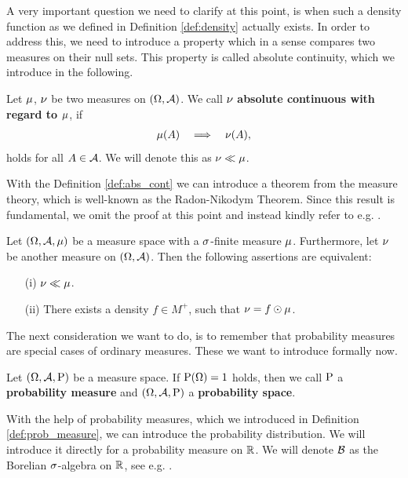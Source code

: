 A very important question we need to clarify at this point, is when such a density function as we defined in Definition \ref{def:density} actually exists. In order to address this, we need to introduce a property which in a sense compares two measures on their null sets. This property is called absolute continuity, which we introduce in the following.

\begin{definition}\label{def:abs_cont}
Let $\operatorname{\mu}$, $\operatorname{\nu}$ be two measures on $(\Omega, \operatorname{\mathcal{A}})$. We call $\operatorname{\nu}$ \textbf{absolute continuous with regard to $\operatorname{\mu}$}, if
\begin{align*}
\operatorname{\mu}(A) \quad \Longrightarrow \quad \operatorname{\nu}(A),
\end{align*}
holds for all $A\in\operatorname{\mathcal{A}}$. We will denote this as $\operatorname{\nu} \ll \operatorname{\mu}$.
\end{definition}

With the Definition \ref{def:abs_cont} we can introduce a theorem from the measure theory, which is well-known as the Radon-Nikodym Theorem. Since this result is fundamental, we omit the proof at this point and instead kindly refer to e.g. \cite[Theorem~2.38]{meintrup2006stochastik}.

\begin{theorem}\label{theoreom:radon-nikodym}
Let $(\Omega, \operatorname{\mathcal{A}}, \operatorname{\mu})$ be a measure space with a $\operatorname{\sigma}$-finite measure $\operatorname{\mu}$. Furthermore, let $\operatorname{\nu}$ be another measure on $(\Omega, \operatorname{\mathcal{A}})$. Then the following assertions are equivalent:
\begin{enumerate}
\item[(i)] $\operatorname{\nu} \ll \operatorname{\mu}$.
\item[(ii)] There exists a density $f\in M^{+}$, such that $\operatorname{\nu} = f \odot \operatorname{\mu}$.
\end{enumerate}
\end{theorem}

The next consideration we want to do, is to remember that probability measures are special cases of ordinary measures. These we want to introduce formally now.

\begin{definition}\label{def:prob_measure}
Let $(\Omega, \operatorname{\mathcal{A}}, \operatorname{\text{P}})$ be a measure space. If $\operatorname{\text{P}}(\Omega) = 1$ holds, then we call $\operatorname{\text{P}}$ a \textbf{probability measure} and $(\Omega, \operatorname{\mathcal{A}}, \operatorname{\text{P}})$ a \textbf{probability space}.
\end{definition}

With the help of probability measures, which we introduced in Definition \ref{def:prob_measure}, we can introduce the probability distribution. We will introduce it directly for a probability measure on $\operatorname{\mathbb{R}}$. We will denote $\operatorname{\mathcal{B}}$ as the Borelian $\operatorname{\sigma}$-algebra on $\operatorname{\mathbb{R}}$, see e.g. \cite[Definition~1.13]{meintrup2006stochastik}.

